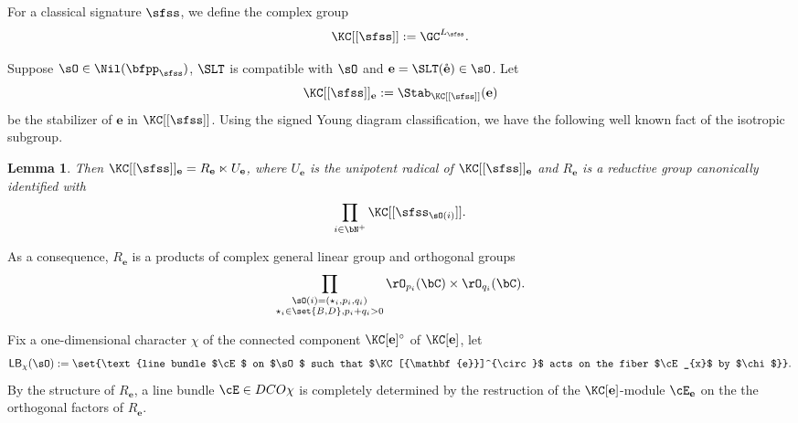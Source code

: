 \documentclass[12pt,a4paper]{amsart}
\def\Im{\operatorname{Im}}
\newcommand{\X}{\mathbf{X}}
\numberwithin{equation}{section}
\newtheorem{lem}[thm]{Lemma}
\theoremstyle{remark}
\def\X{{\mathbf{e}}}
\def\Xslt{\mathring{\X}}
\begin{document}
For a classical signature $\sfss$, we define the complex group
\[
  \KC[[\sfss]] := \GC^{L_{\sfss}}.
\]

 Suppose $\sO\in \Nil(\bfpp_{\sfss})$, $\SLT$ is
compatible with $\sO$ and $\X = \SLT(\Xslt)\in \sO$. Let
\[
  \KC[[\sfss]]_{\X}:=\Stab_{\KC[[\sfss]]}(\X)
\]
be the stabilizer of $\X$ in
$\KC[[\sfss]]$.
Using the signed Young diagram classification, we have the following well known
fact of the isotropic subgroup.
\begin{lem}\label{lem:KX1}
 Then $\KC[[\sfss]]_{\X}= R_\X\ltimes U_\X$,
  where $U_\X$ is the unipotent radical of $\KC[[\sfss]]_{\X}$ and $R_{\X}$ is a reductive
  group canonically identified with
 \[
   \prod_{i\in \bN^{+}} \KC[[\sfss_{\sO(i)}]].
 \]
\end{lem}
As a consequence, $R_{\X}$ is a products of complex general linear group and
orthogonal groups
\[
  \prod_{\substack{\sO(i)=(\star_{i},p_{i},q_{i})\\
      \star_{i}\in \set{B,D}, p_{i}+q_{i}>0
    }} \rO_{p_{i}}(\bC)\times \rO_{q_{i}}(\bC).
\]

\medskip

\def\DCO#1{\mathsf{LB}_{#1}(\sO)}

Fix a one-dimensional character $\chi$ of the connected component $\KC[\X]^{\circ}$ of $\KC[\X]$,
let
\[
\DCO{\chi} := \set{\text{line bundle $\cE$ on $\sO$ such that $\KC[\X]^{\circ}$
    acts on the fiber $\cE_{x}$ by $\chi$}}.
\]
By the structure of $R_{\X}$, a line bundle $\cE\in DCO{\chi}$ is completely
determined by
the restruction of the $\KC[\X]$-module $\cE_{\X}$ on the
the orthogonal factors of $R_{\X}$.
\end{document}
